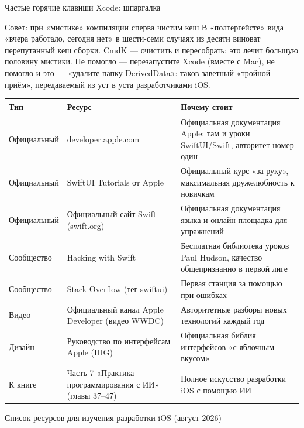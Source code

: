 \begin{center}\small\color{gray}Частые горячие клавиши Xcode: шпаргалка\end{center}

\begin{tcbinfo}{Совет: при «мистике» компиляции сперва чистим кеш}
В «полтергейсте» вида «вчера работало, сегодня нет» в шести-семи случаях из десяти виноват перепутанный кеш сборки. CmdK — очистить и пересобрать: это лечит большую половину мистики. Не помогло — перезапустите Xcode (вместе с Mac), не помогло и это — «удалите папку DerivedData»: таков заветный «тройной приём», передаваемый из уст в уста разработчиками iOS.

\end{tcbinfo}



\begin{center}
\begin{tabularx}{\linewidth}{|X|X|X|}
\hline
\textbf{Тип} & \textbf{Ресурс} & \textbf{Почему стоит} \tabularnewline
\hline
Официальный & developer.apple.com & Официальная документация Apple: там и уроки SwiftUI/Swift, авторитет номер один \tabularnewline
Официальный & SwiftUI Tutorials от Apple & Официальный курс «за руку», максимальная дружелюбность к новичкам \tabularnewline
Официальный & Официальный сайт Swift (swift.org) & Официальная документация языка и онлайн-площадка для упражнений \tabularnewline
Сообщество & Hacking with Swift & Бесплатная библиотека уроков Paul Hudson, качество общепризнанно в первой лиге \tabularnewline
Сообщество & Stack Overflow (тег swiftui) & Первая станция за помощью при ошибках \tabularnewline
Видео & Официальный канал Apple Developer (видео WWDC) & Авторитетные разборы новых технологий каждый год \tabularnewline
Дизайн & Руководство по интерфейсам Apple (HIG) & Официальная библия интерфейсов «с яблочным вкусом» \tabularnewline
К книге & Часть 7 «Практика программирования с ИИ» (главы 37–47) & Полное искусство разработки iOS с помощью ИИ \tabularnewline
\hline
\end{tabularx}
\end{center}

\begin{center}\small\color{gray}Список ресурсов для изучения разработки iOS (август 2026)\end{center}


